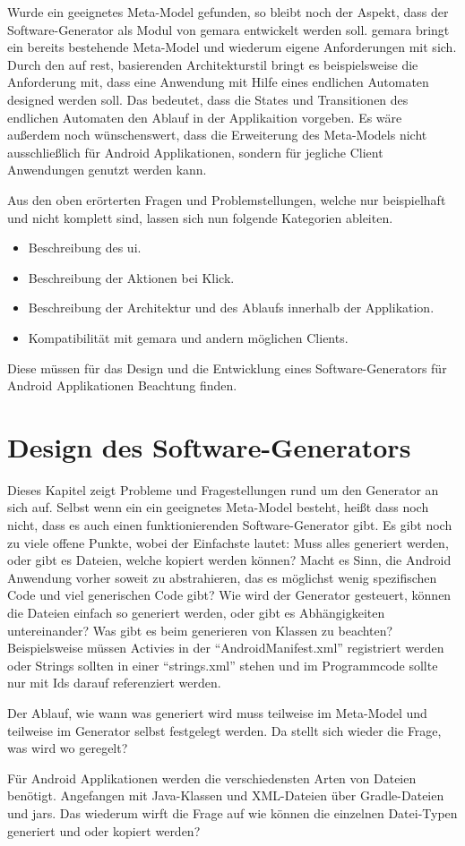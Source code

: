 Wurde ein geeignetes Meta-Model gefunden, so bleibt noch der Aspekt, dass der Software-Generator als Modul von \acf{gemara} entwickelt werden soll. \acs{gemara} bringt ein bereits bestehende Meta-Model und wiederum eigene Anforderungen mit sich. Durch den auf \acf{rest}, basierenden Architekturstil bringt es beispielsweise die Anforderung mit, dass eine Anwendung mit Hilfe eines endlichen Automaten designed werden soll. Das bedeutet, dass die States und Transitionen des endlichen Automaten den Ablauf in der Applikaition vorgeben.
Es wäre außerdem noch wünschenswert, dass die Erweiterung des Meta-Models nicht ausschließlich für Android Applikationen, sondern für jegliche Client Anwendungen genutzt werden kann.

Aus den oben erörterten Fragen und Problemstellungen, welche nur beispielhaft und nicht komplett sind, lassen sich nun folgende Kategorien ableiten.

\begin{itemize}
	\item Beschreibung des \acl{ui}.
	\item Beschreibung der Aktionen bei Klick.
	\item Beschreibung der Architektur und des Ablaufs innerhalb der Applikation.
	\item Kompatibilität mit \acs{gemara} und andern möglichen Clients. 
\end{itemize}

Diese müssen für das Design und die Entwicklung eines Software-Generators für Android Applikationen Beachtung finden.

\section{Design des Software-Generators}

Dieses Kapitel zeigt Probleme und Fragestellungen rund um den Generator an sich auf. Selbst wenn ein ein geeignetes Meta-Model besteht, heißt dass noch nicht, dass es auch einen funktionierenden Software-Generator gibt. Es gibt noch zu viele offene Punkte, wobei der Einfachste lautet: Muss alles generiert werden, oder gibt es Dateien, welche kopiert werden können? Macht es Sinn, die Android Anwendung vorher soweit zu abstrahieren, das es möglichst wenig spezifischen Code und viel generischen Code gibt? Wie wird der Generator gesteuert, können die Dateien einfach so generiert werden, oder gibt es Abhängigkeiten untereinander? Was gibt es beim generieren von Klassen zu beachten? Beispielsweise müssen Activies in der \enquote{AndroidManifest.xml} registriert werden oder Strings sollten in einer \enquote{strings.xml} stehen und im Programmcode sollte nur mit Ids darauf referenziert werden.

Der Ablauf, wie wann was generiert wird muss teilweise im Meta-Model und teilweise im Generator selbst festgelegt werden. Da stellt sich wieder die Frage, was wird wo geregelt? 

Für Android Applikationen werden die verschiedensten Arten von Dateien benötigt. Angefangen mit Java-Klassen und XML-Dateien über Gradle-Dateien und \acfp{jar}.
Das wiederum wirft die Frage auf wie können die einzelnen Datei-Typen generiert und oder kopiert werden?

